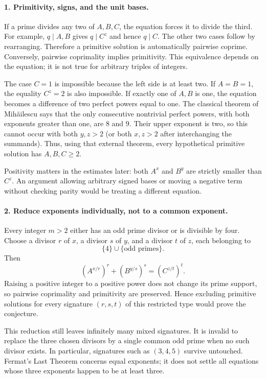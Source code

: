 \documentclass[11pt]{article}
\begin{document}
\paragraph{1. Primitivity, signs, and the unit bases.}
If a prime divides any two of $A,B,C$, the equation forces it to divide the third. For example, $q\mid A,B$ gives $q\mid C^z$ and hence $q\mid C$. The other two cases follow by rearranging. Therefore a primitive solution is automatically pairwise coprime. Conversely, pairwise coprimality implies primitivity. This equivalence depends on the equation; it is not true for arbitrary triples of integers.

The case $C=1$ is impossible because the left side is at least two. If $A=B=1$, the equality $C^z=2$ is also impossible. If exactly one of $A,B$ is one, the equation becomes a difference of two perfect powers equal to one. The classical theorem of Mih\u{a}ilescu says that the only consecutive nontrivial perfect powers, with both exponents greater than one, are $8$ and $9$. Their upper exponent is two, so this cannot occur with both $y,z>2$ (or both $x,z>2$ after interchanging the summands). Thus, using that external theorem, every hypothetical primitive solution has $A,B,C\ge2$.

Positivity matters in the estimates later: both $A^x$ and $B^y$ are strictly smaller than $C^z$. An argument allowing arbitrary signed bases or moving a negative term without checking parity would be treating a different equation.

\paragraph{2. Reduce exponents individually, not to a common exponent.}
Every integer $m>2$ either has an odd prime divisor or is divisible by four. Choose a divisor $r$ of $x$, a divisor $s$ of $y$, and a divisor $t$ of $z$, each belonging to
\[
 \{4\}\cup\{\text{odd primes}\}.
\]
Then
\[
 (A^{x/r})^r+(B^{y/s})^s=(C^{z/t})^t.
\]
Raising a positive integer to a positive power does not change its prime support, so pairwise coprimality and primitivity are preserved. Hence excluding primitive solutions for every signature $(r,s,t)$ of this restricted type would prove the conjecture.

This reduction still leaves infinitely many mixed signatures. It is invalid to replace the three chosen divisors by a single common odd prime when no such divisor exists. In particular, signatures such as $(3,4,5)$ survive untouched. Fermat's Last Theorem concerns equal exponents; it does not settle all equations whose three exponents happen to be at least three.
\end{document}
